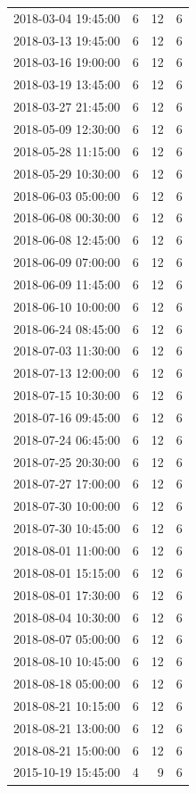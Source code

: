 \begin{tabular}{lrrr}
2018-03-04 19:45:00 & 6 & 12 & 6 \\
2018-03-13 19:45:00 & 6 & 12 & 6 \\
2018-03-16 19:00:00 & 6 & 12 & 6 \\
2018-03-19 13:45:00 & 6 & 12 & 6 \\
2018-03-27 21:45:00 & 6 & 12 & 6 \\
2018-05-09 12:30:00 & 6 & 12 & 6 \\
2018-05-28 11:15:00 & 6 & 12 & 6 \\
2018-05-29 10:30:00 & 6 & 12 & 6 \\
2018-06-03 05:00:00 & 6 & 12 & 6 \\
2018-06-08 00:30:00 & 6 & 12 & 6 \\
2018-06-08 12:45:00 & 6 & 12 & 6 \\
2018-06-09 07:00:00 & 6 & 12 & 6 \\
2018-06-09 11:45:00 & 6 & 12 & 6 \\
2018-06-10 10:00:00 & 6 & 12 & 6 \\
2018-06-24 08:45:00 & 6 & 12 & 6 \\
2018-07-03 11:30:00 & 6 & 12 & 6 \\
2018-07-13 12:00:00 & 6 & 12 & 6 \\
2018-07-15 10:30:00 & 6 & 12 & 6 \\
2018-07-16 09:45:00 & 6 & 12 & 6 \\
2018-07-24 06:45:00 & 6 & 12 & 6 \\
2018-07-25 20:30:00 & 6 & 12 & 6 \\
2018-07-27 17:00:00 & 6 & 12 & 6 \\
2018-07-30 10:00:00 & 6 & 12 & 6 \\
2018-07-30 10:45:00 & 6 & 12 & 6 \\
2018-08-01 11:00:00 & 6 & 12 & 6 \\
2018-08-01 15:15:00 & 6 & 12 & 6 \\
2018-08-01 17:30:00 & 6 & 12 & 6 \\
2018-08-04 10:30:00 & 6 & 12 & 6 \\
2018-08-07 05:00:00 & 6 & 12 & 6 \\
2018-08-10 10:45:00 & 6 & 12 & 6 \\
2018-08-18 05:00:00 & 6 & 12 & 6 \\
2018-08-21 10:15:00 & 6 & 12 & 6 \\
2018-08-21 13:00:00 & 6 & 12 & 6 \\
2018-08-21 15:00:00 & 6 & 12 & 6 \\
2015-10-19 15:45:00 & 4 & 9 & 6 \\

\end{tabular}
